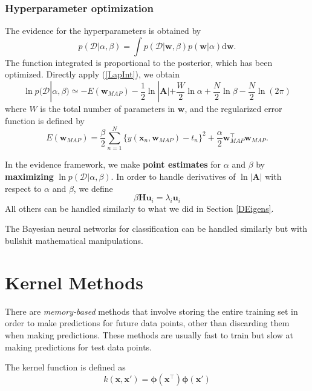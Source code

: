 \documentclass[a4paper]{book}
\newcommand{\ud}{\mathrm{d}}
\renewcommand{\bf}{\mathbf}
\renewcommand{\cal}{\mathcal}
\newcommand{\imp}[1]{\textit{#1}}
\newcommand{\bs}{\boldsymbol}
\begin{document}
\subsubsection{Hyperparameter optimization}
The evidence for the hyperparameters is obtained by
\begin{equation}
	p(\cal{D}|\alpha,\beta) = \int p(\cal{D}|\bf{w},\beta)p(\bf{w}|\alpha) \ud \bf{w}.
\end{equation}
The function integrated is proportional to the posterior, which has been optimized. Directly apply (\ref{LapInt}), we obtain
\begin{equation}
	\ln p(\cal{D}|\alpha,\beta) \simeq -E(\bf{w}_{MAP}) - \frac{1}{2} \ln |\bf{A}| + \frac{W}{2}\ln \alpha + \frac{N}{2} \ln \beta -\frac{N}{2} \ln(2\pi)
\end{equation}
where $W$ is the total number of parameters in $\bf{w}$, and the regularized error function is defined by
\begin{equation}
	E(\bf{w}_{MAP}) = \frac{\beta}{2} \sum_{n=1}^N \{ y(\bf{x}_n,\bf{w}_{MAP})-t_n \}^2 + \frac{\alpha}{2}\bf{w}_{MAP}^{\intercal} \bf{w}_{MAP}.
\end{equation}

In the evidence framework, we make \textbf{point estimates} for $\alpha$ and $\beta$ by \textbf{maximizing} $\ln p(\cal{D}|\alpha,\beta)$. In order to handle derivatives of $\ln |\bf{A}|$ with respect to $\alpha$ and $\beta$, we define
\begin{equation}
	\beta \bf{H} \bf{u}_i = \lambda_i \bf{u}_i
\end{equation}
All others can be handled similarly to what we did in Section \ref{DEigens}.

The Bayesian neural networks for classification can be handled similarly but with bullshit mathematical manipulations.
\section{Kernel Methods}
There are \imp{memory-based} methods that involve storing the entire training set in order to make predictions for future data points, other than discarding them when making predictions. These methods are usually fast to train but slow at making predictions for test data points.

The kernel function is defined as
\begin{equation}
	k(\bf{x,x'}) = \bs{\phi}(\bf{x}^{\intercal}) \bs{\phi}(\bf{x'})
\end{equation}
\end{document}

